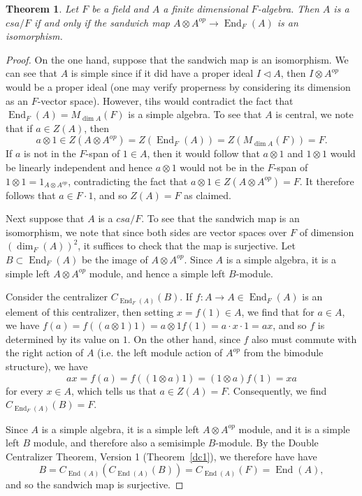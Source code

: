\documentclass[12pt]{report}
\theoremstyle{plain}
\newtheorem{thm}{Theorem}[section]
\newcommand{\oper}[1]{\operatorname{#1}}
\newcommand{\End}{\oper{End}}
\begin{document}
\begin{thm} \label{sandwich csa}
Let $F$ be a field and $A$ a finite dimensional $F$-algebra. Then $A$ is a
$csa/F$ if and only if the sandwich map $A \otimes A^{op} \to \End_F(A)$ is
an isomorphism.
\end{thm}
\begin{proof}
On the one hand, suppose that the sandwich map is an isomorphism. We can
see that $A$ is simple since if it did have a proper ideal $I \triangleleft A$,
then $I \otimes A^{op}$ would be a proper ideal (one may verify properness
by considering its dimension as an $F$-vector space). However, tihs would
contradict the fact that  $\End_F(A) = M_{\dim A}(F)$ is a simple algebra.
To see that $A$ is central, we note that if $a \in Z(A)$, then 
\[a \otimes 1 \in Z(A \otimes A^{op}) = Z(\End_F(A)) = Z(M_{\dim A}(F)) =
F.\]
If $a$ is not in the $F$-span of $1 \in A$, then it would follow that $a
\otimes 1$ and $1 \otimes 1$ would be linearly independent and hence $a
\otimes 1$ would not be in the $F$-span of $1 \otimes 1 = 1_{A \otimes
A^{op}}$, contradicting the fact that $a \otimes 1 \in Z(A \otimes A^{op})
= F$. It therefore follows that $a \in F \cdot 1$, and so $Z(A) = F$ as
claimed.

Next suppose that $A$ is a $csa/F$. To see that the sandwich map is an
isomorphism, we note that since both sides are vector spaces over $F$ of
dimension $\left(\dim_F(A)\right)^2$, it suffices to check that the map is
surjective. Let $B \subset \End_F(A)$ be the image of $A \otimes A^{op}$.
Since $A$ is a simple algebra, it is a simple left $A \otimes A^{op}$
module, and hence a simple left $B$-module. 

Consider the centralizer $C_{\End_F(A)}(B)$. If $f: A \to A \in \End_F(A)$
is an element of this centralizer, then setting $x = f(1) \in A$, we find
that for $a \in A$, we have $f(a) = f((a \otimes 1) 1) = a \otimes 1 f(1) =
a \cdot x \cdot 1 = ax$, and so $f$ is determined by its value on $1$. On
the other hand, since $f$ also must commute with the right action of $A$
(i.e. the left module action of $A^{op}$ from the bimodule structure), we
have
\[ ax = f(a) = f((1 \otimes a) 1) = (1 \otimes a) f(1) = xa \]
for every $x \in A$, which tells us that $a \in Z(A) = F$. Consequently, we
find $C_{\End_F(A)}(B) = F$.

Since $A$ is a simple algebra, it is a simple left $A \otimes A^{op}$ module,
and it is a simple left $B$ module, and therefore also a semisimple
$B$-module. By the Double Centralizer Theorem, Version 1
(Theorem~\ref{dc1}), we therefore have have
\[B = C_{\End(A)}(C_{\End(A)}(B)) = C_{\End(A)}(F) = \End(A), \]
and so the sandwich map is surjective.
\end{proof}
\end{document}
